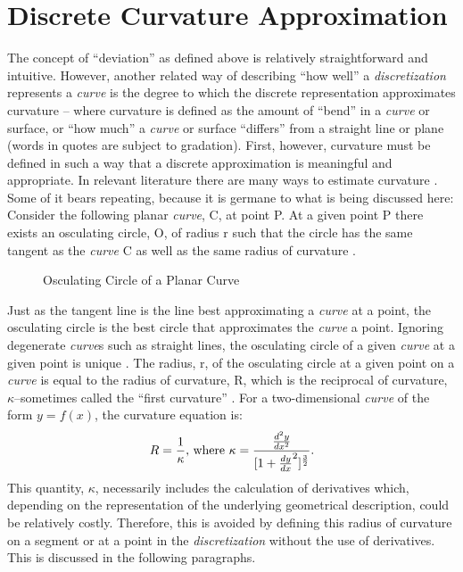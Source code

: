 \section{Discrete Curvature Approximation}
The concept of ``deviation'' as defined above is relatively 
straightforward and intuitive. However, another related way of describing 
``how well'' a \textit{discretization} represents a \textit{curve} is the 
degree to which the discrete representation approximates curvature -- 
where curvature is defined as the amount of ``bend'' in a \textit{curve} 
or surface, or ``how much'' a \textit{curve} or surface ``differs'' from a 
straight line or plane (words in quotes are subject to gradation). First, 
however, curvature must be defined in such a way that a discrete 
approximation is meaningful and appropriate. In relevant literature there 
are many ways to estimate curvature \cite{hermann07}. Some of it bears 
repeating, because it is germane to what is being discussed here: Consider 
the following planar \textit{curve}, C, at point P. At a given point P 
there exists an osculating circle, O, of radius r such that the circle has 
the same tangent as the \textit{curve} C as well as the same radius of 
curvature \cite{gray97}.  

\begin{figure}[h!]
  \caption{\label{fig:OsculatingCircle} Osculating Circle of a Planar Curve}
\end{figure}

\noindent Just as the tangent line is the line best approximating a \textit{curve} at a point, the osculating 
circle is the best circle that approximates the \textit{curve} a point. Ignoring degenerate \textit{curve}s such 
as straight lines, the osculating circle of a given \textit{curve} at a given point is unique \cite{gray97}. The 
radius, r, of the osculating circle at a given point on a \textit{curve} is equal to the radius of curvature, R, 
which is the reciprocal of curvature, $\kappa$--sometimes called the ``first curvature'' \cite{kreyszig91}. For a 
two-dimensional \textit{curve} of the form $y=f(x)$, the curvature equation is: \[
R=\frac{1}{\kappa} \textnormal{, where } 
\kappa=\frac{\frac{d^2y}{dx^2}}{[1+\frac{dy}{dx}^2 ]^\frac{3}{2}}. 
\]
\noindent This quantity, $\kappa$, necessarily includes the calculation of 
derivatives which, depending on the representation of the underlying geometrical description, could be relatively costly. Therefore, this is avoided by defining this radius of curvature on a segment or at a point in the \textit{discretization} without the use of derivatives. This is discussed in the following paragraphs.

